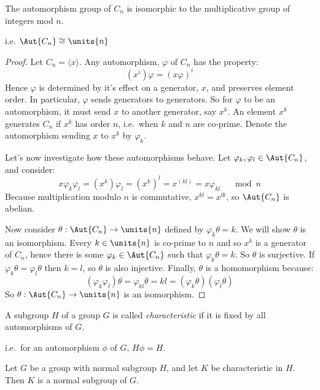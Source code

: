 \begin{lemma}\label{lem:aut}
    The automorphism group of \(C_n\) is isomorphic to the multiplicative group
    of integers mod \(n\).

    i.e. \(\Aut{C_n} \cong \units{n}\)
\end{lemma}

\begin{proof}
    Let \(C_n = \langle x \rangle\).
    Any automorphism, \(\varphi\) of \(C_n\) has the property:
    \[(x^i)\varphi = {(x\varphi)}^i\]
    Hence \(\varphi\) is determined by it's effect on a generator, \(x\), and preserves element
    order.
    In particular, \(\varphi\) sends generators to generators.
    So for \(\varphi\) to be an automorphism, it must send \(x\) to another generator, say \(x^k\).
    An element \(x^k\) generates \(C_n\) if \(x^k\) has order \(n\), i.e.\ when \(k\) and \(n\) are co-prime.
    Denote the automorphism sending \(x\) to \(x^k\) by \(\varphi_k\).

    Let's now investigate how these automorphisms behave.
    Let \(\varphi_k, \varphi_l \in \Aut{C_n}\), and consider:
    \[x\varphi_k\varphi_l = (x^k)\varphi_l = {(x^k)}^l = x^{(kl)} = x\varphi_{kl} \quad \mod{n}\]
    Because multiplication modulo \(n\) is commutative, \(x^{kl} = x^{lk}\), so \(\Aut{C_n}\) is abelian.

    Now consider \(\theta:\Aut{C_n} \to \units{n}\) defined by \(\varphi_k\theta = k\).
    We will show \(\theta\) is an isomorphism.
    Every \(k \in \units{n}\) is co-prime to \(n\) and so \(x^k\) is a generator of \(C_n\), hence there is some \(\varphi_k
    \in \Aut{C_n}\) such that \(\varphi_k\theta = k\).
    So \(\theta\) is surjective.
    If \(\varphi_k\theta = \varphi_l\theta\) then \(k = l\), so \(\theta\) is also injective.
    Finally, \(\theta\) is a homomorphism because:
    \[(\varphi_k\varphi_l)\theta = \varphi_{kl}\theta = kl = (\varphi_k\theta)(\varphi_l\theta)\]
    So \(\theta:\Aut{C_n} \to \units{n}\) is an isomorphism.
\end{proof}

\begin{definition}
    A subgroup \(H\) of a group \(G\) is called \emph{characteristic} if it is fixed by all automorphisms of \(G\).

    i.e.\ for an automorphism \(\phi\) of \(G\), \(H\phi = H\).
\end{definition}

\begin{lemma}\label{lem:char}
    Let \(G\) be a group with normal subgroup \(H\), and let \(K\) be characteristic in \(H\).
    Then \(K\) is a normal subgroup of \(G\).
\end{lemma}

